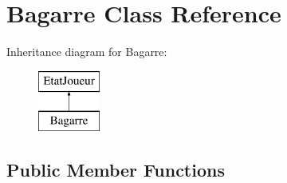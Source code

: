 \hypertarget{class_bagarre}{\section{Bagarre Class Reference}
\label{class_bagarre}
}
Inheritance diagram for Bagarre\-:\begin{figure}[H]
\begin{center}
\leavevmode
\includegraphics[height=2.000000cm]{class_bagarre}
\end{center}
\end{figure}
\subsection*{Public Member Functions}

